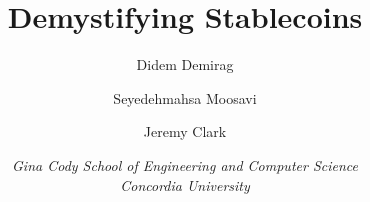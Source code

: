 \documentclass[letterpaper]{article}
\begin{document}
\title{Demystifying Stablecoins}
\author{Didem Demirag \and Seyedehmahsa Moosavi \and Jeremy Clark}
\date{\textit{Gina Cody School of Engineering and Computer Science\\Concordia University}}
\maketitle


\begin{abstract}

\end{abstract}







%

\end{document}
